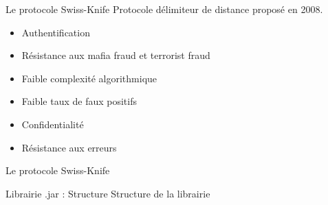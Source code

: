\documentclass[aspectratio=169]{beamer}
\begin{document}
\begin{frame}{Le protocole Swiss-Knife}
    Protocole délimiteur de distance proposé en 2008. \cite{SwissKnife}

    \bigskip

    \begin{itemize}
        \item Authentification
        \item Résistance aux mafia fraud et terrorist fraud
        \item Faible complexité algorithmique
        \item Faible taux de faux positifs
        \item Confidentialité
        \item Résistance aux erreurs
    \end{itemize}
\end{frame}

\begin{frame}{Le protocole Swiss-Knife}

    \centering

\end{frame}

\begin{frame}{Librairie .jar : Structure}
    Structure de la librairie
\end{frame}
\end{document}
